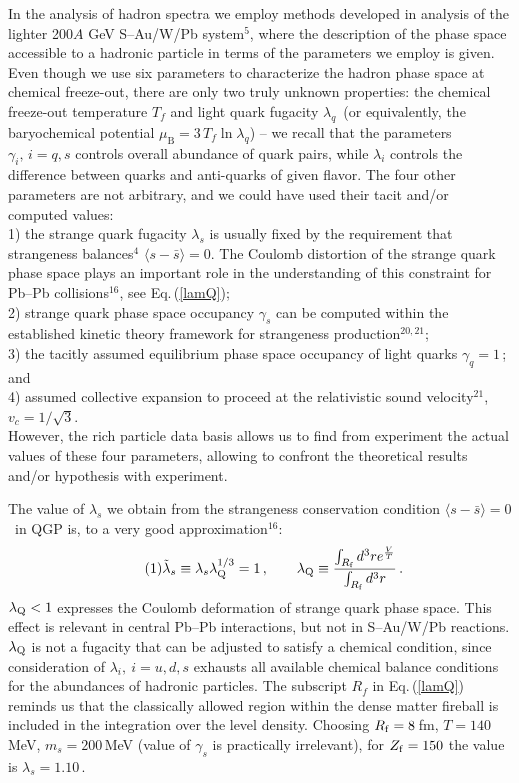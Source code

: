 \begin{mdframed}[linecolor=gray,roundcorner=12pt,backgroundcolor=Dandelion!15,linewidth=1pt,leftmargin=0cm,rightmargin=0cm,topline=true,bottomline=true,skipabove=12pt]
In the analysis of hadron spectra we employ methods developed in analysis of the lighter 200$A$ GeV S--Au/W/Pb system$^{5}$, where the description of the phase space accessible to a hadronic particle in terms of the parameters we employ is given. Even though we use six parameters to characterize the hadron phase space at chemical freeze-out, there are only two truly unknown properties: the chemical freeze-out temperature $T_{f}$ and light quark fugacity $\lambda_q$\, (or equivalently, the baryochemical potential $\mu_\mathrm{B}=3\,T_{f}\ln \lambda_q$) -- we recall that the parameters $\gamma_i,\,i=q,s$ controls overall abundance of quark pairs, while $\lambda_i$ controls the difference between quarks and anti-quarks of given flavor. The four other parameters are not arbitrary, and we could have used their tacit and/or computed values:\\ 1) the strange quark fugacity $\lambda_s$ is usually fixed by the requirement that strangeness balances$^{4}$ $\langle s-{\bar s}\rangle=0$. The Coulomb distortion of the strange quark phase space plays an important role in the understanding of this constraint for Pb--Pb collisions$^{16}$, see Eq.\,(\ref{lamQ});\\ 2) strange quark phase space occupancy $\gamma_s$ can be computed within the established kinetic theory framework for strangeness production$^{20,21}$;\\ 3) the tacitly assumed equilibrium phase space occupancy of light quarks $\gamma_q=1$\,; and \\ 4) assumed collective expansion to proceed at the relativistic sound velocity$^{21}$, $v_c=1/\sqrt{3}$.\\ However, the rich particle data basis allows us to find from experiment the actual values of these four parameters, allowing to confront the theoretical results and/or hypothesis with experiment. 

The value of $\lambda_s$ we obtain from the strangeness conservation condition $\langle s-{\bar s}\rangle=0$\ in QGP is, to a very good approximation$^{16}$:
\begin{equation}\label{lamQ}
\tag{1}\tilde\lambda_s\equiv \lambda_s \lambda_{\rm Q}^{1/3}=1\,,\qquad
\lambda_{\rm Q}\equiv
\frac{\int_{R_{\rm f}} d^3r e^{\frac V{T}} } {\int_{R_{\rm f}} d^3r}\,.
\end{equation}
 $\lambda_{\rm Q}<1$ expresses the Coulomb deformation of strange quark phase space. This effect is relevant in central Pb--Pb interactions, but not in S--Au/W/Pb reactions. $\lambda_{\rm Q}$ is not a fugacity that can be adjusted to satisfy a chemical condition, since consideration of $\lambda_i,\ i=u,d,s$ exhausts all available chemical balance conditions for the abundances of hadronic particles. The subscript ${R_{f}}$ in Eq.\,(\ref{lamQ}) reminds us that the classically allowed region within the dense matter fireball is included in the integration over the level density. Choosing $R_{\rm f}=8$\,fm, $T=140$\,MeV, $m_s=200$\,MeV (value of $\gamma_s$ is practically irrelevant), for $Z_{\rm f}=150$ the value is $\lambda_s=1.10$\,.


\end{mdframed}
